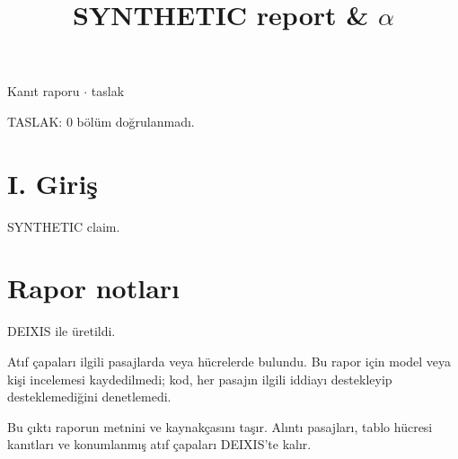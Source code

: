 \documentclass[journal]{IEEEtran}
\begin{document}
\renewcommand{\abstractname}{Özet}
\renewcommand{\IEEEkeywordsname}{Dizin Terimleri}
\renewcommand{\refname}{Kaynaklar}

\title{SYNTHETIC report \& \ensuremath{\alpha}}

\maketitle

\noindent Kanıt raporu \ensuremath{\cdot} taslak

\noindent TASLAK: 0 bölüm doğrulanmadı.

\section*{I. Giriş}

SYNTHETIC claim. \cite{Synth26}

\section*{Rapor notları}

DEIXIS ile üretildi.

Atıf çapaları ilgili pasajlarda veya hücrelerde bulundu. Bu rapor için model veya kişi incelemesi kaydedilmedi; kod, her pasajın ilgili iddiayı destekleyip desteklemediğini denetlemedi.

Bu çıktı raporun metnini ve kaynakçasını taşır. Alıntı pasajları, tablo hücresi kanıtları ve konumlanmış atıf çapaları DEIXIS'te kalır.




\end{document}
